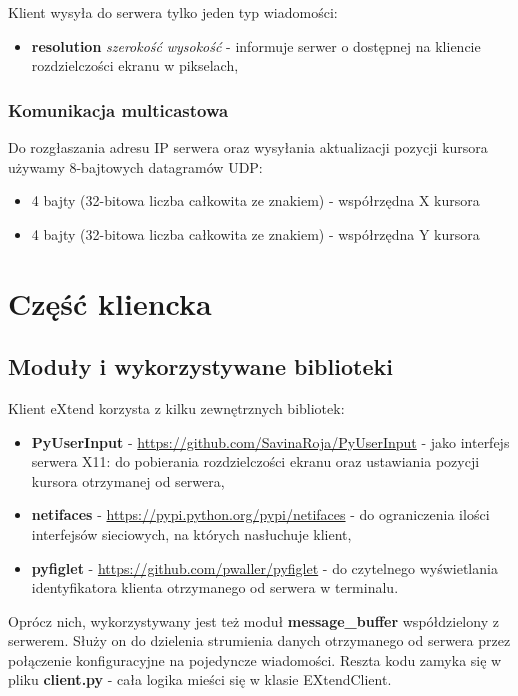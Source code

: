       Klient wysyła do serwera tylko jeden typ wiadomości:
      \begin{itemize}
        \item \textbf{resolution} \emph{szerokość} \emph{wysokość} - informuje serwer o dostępnej na kliencie rozdzielczości ekranu w pikselach,
      \end{itemize}

    \subsubsection{Komunikacja multicastowa}

      Do rozgłaszania adresu IP serwera oraz wysyłania aktualizacji pozycji kursora używamy 8-bajtowych datagramów UDP:
      \begin{itemize}
        \item 4 bajty (32-bitowa liczba całkowita ze znakiem) - współrzędna X kursora
        \item 4 bajty (32-bitowa liczba całkowita ze znakiem) - współrzędna Y kursora
      \end{itemize}

\section{Część kliencka}

  \subsection{Moduły i wykorzystywane biblioteki}
    Klient eXtend korzysta z kilku zewnętrznych bibliotek:
    \begin{itemize}
      \item \textbf{PyUserInput} - \url{https://github.com/SavinaRoja/PyUserInput} - jako interfejs serwera X11: do pobierania rozdzielczości ekranu oraz ustawiania pozycji kursora otrzymanej od serwera,
      \item \textbf{netifaces} - \url{https://pypi.python.org/pypi/netifaces} - do ograniczenia ilości interfejsów sieciowych, na których nasłuchuje klient,
      \item \textbf{pyfiglet} - \url{https://github.com/pwaller/pyfiglet} - do czytelnego wyświetlania identyfikatora klienta otrzymanego od serwera w terminalu.
    \end{itemize}

    Oprócz nich, wykorzystywany jest też moduł \textbf{message\_buffer} współdzielony z serwerem. Służy on do dzielenia strumienia danych otrzymanego od serwera przez połączenie konfiguracyjne na pojedyncze wiadomości. Reszta kodu zamyka się w pliku \textbf{client.py} - cała logika mieści się w klasie EXtendClient.

